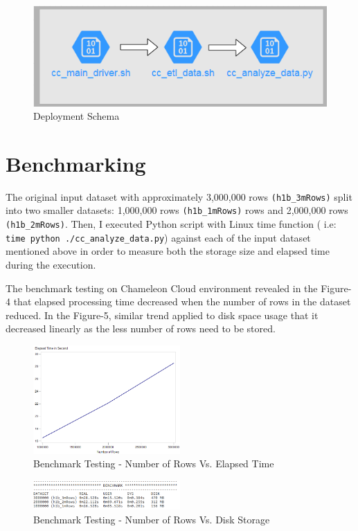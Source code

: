 \documentclass[9pt,twocolumn,twoside]{styles/osajnl}
\begin{document}
\begin{figure}[H]
 \centering
\includegraphics[scale=0.6]{images/image22}
\caption{Deployment Schema}
\end{figure}

\section{Benchmarking}
 The original input dataset with approximately 3,000,000 rows \verb|(h1b_3mRows)| split into two smaller datasets: 1,000,000 rows \verb|(h1b_1mRows)| rows and 2,000,000 rows \verb|(h1b_2mRows)|. Then, I  executed Python script with Linux time function ( i.e:  \verb|time python ./cc_analyze_data.py|)  against each of the input dataset mentioned above in order to measure both the storage size and elapsed time during the execution. 
 
 The benchmark testing on Chameleon Cloud environment revealed in the Figure-4 that elapsed processing time decreased  when the number of rows in the dataset reduced. In the Figure-5, similar trend applied to disk space usage that it decreased linearly  as  the less number of rows need to be stored.


\begin{figure}[H]
  \centering
  \includegraphics[width=0.5\textwidth]{images/image21}     
  \caption{Benchmark Testing - Number of Rows Vs. Elapsed Time}
  \end{figure}
  
  \begin{figure}[H]
  \centering
  \includegraphics[width=0.5\textwidth]{images/image20}     
  \caption{Benchmark Testing - Number of Rows Vs. Disk Storage }
  \end{figure}
\end{document}
